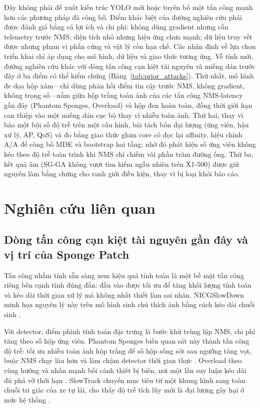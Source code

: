 \documentclass[a4paper,fleqn]{cas-dc}
\begin{document}
Đây không phải đề xuất kiến trúc YOLO mới hoặc tuyên bố một tấn công mạnh hơn các phương pháp đã công bố. Điểm khác biệt của đường nghiên cứu phải được đánh giá bằng cả lợi ích và chi phí: không dùng gradient nhưng cần telemetry trước NMS; diện tích nhỏ nhưng hiệu ứng chưa mạnh; dữ liệu truy vết được nhưng phạm vi phần cứng và vật lý còn hạn chế. Các nhận định về lựa chọn triển khai chỉ áp dụng cho mô hình, dữ liệu và giao thức tương ứng. Về tính mới, đường nghiên cứu khác với dòng tấn công cạn kiệt tài nguyên và miếng dán trước đây ở ba điểm có thể kiểm chứng (Bảng~\ref{tab:prior_attacks}). Thứ nhất, mô hình đe dọa hộp xám---chỉ dùng phản hồi điểm tin cậy trước NMS, không gradient, không trọng số---nằm giữa hộp trắng toàn ảnh của các tấn công NMS-latency gần đây (Phantom Sponges, Overload) và hộp đen hoàn toàn, đồng thời giới hạn can thiệp vào một miếng dán cục bộ thay vì nhiễu toàn ảnh. Thứ hai, thay vì báo một bội số độ trễ trên một cấu hình, bài tách bốn đại lượng (ứng viên, hậu xử lý, AP, QoS) và đo bằng giao thức ghim core có đọc lại affinity, hiệu chỉnh A/A để công bố MDE và bootstrap hai tầng; nhờ đó phát hiện số ứng viên không kéo theo độ trễ toàn trình khi NMS chỉ chiếm vài phần trăm đường ống. Thứ ba, kết quả âm (SG-GA không vượt tìm kiếm ngẫu nhiên trên X1-500) được giữ nguyên làm bằng chứng cho ranh giới điều kiện, thay vì bị loại khỏi báo cáo.

\section{Nghiên cứu liên quan}

\subsection{Dòng tấn công cạn kiệt tài nguyên gần đây và vị trí của Sponge Patch}

Tấn công nhắm tính sẵn sàng xem hiệu quả tính toán là một bề mặt tấn công riêng bên cạnh tính đúng đắn: đầu vào được tối ưu để tăng khối lượng tính toán và kéo dài thời gian xử lý mà không nhất thiết làm sai nhãn. NICGSlowDown minh họa nguyên lý này trên mô hình sinh chú thích ảnh bằng cách kéo dài chuỗi sinh \cite{nicgslowdown2022}.

Với detector, điểm phình tính toán đặc trưng là bước khử trùng lặp NMS, chi phí tăng theo số hộp ứng viên. Phantom Sponges biến quan sát này thành tấn công độ trễ: tối ưu nhiễu toàn ảnh hộp trắng để số hộp sống sót sau ngưỡng tăng vọt, buộc NMS chạy lâu hơn và làm chậm detector thời gian thực \cite{phantom2023}. Overload theo cùng hướng và nhấn mạnh bối cảnh thiết bị biên, nơi một lần suy luận kéo dài đủ phá vỡ thời hạn \cite{overload2024}. SlowTrack chuyển mục tiêu từ một khung hình sang toàn chuỗi tri giác của xe tự lái, cho thấy độ trễ tích lũy mới là đại lượng gây hại ở mức hệ thống \cite{slowtrack2024}.
\end{document}

